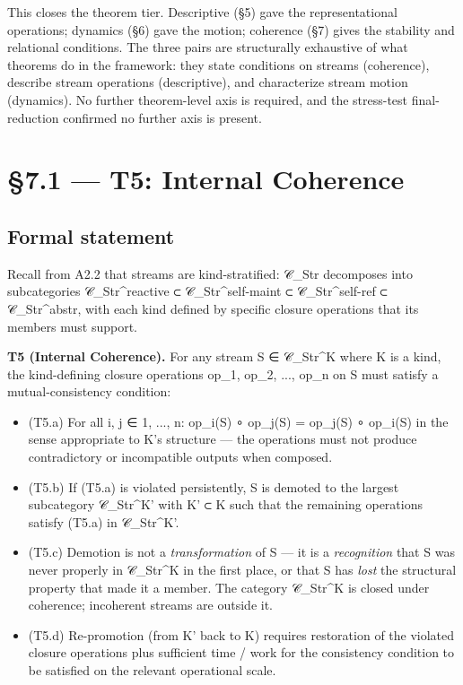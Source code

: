 \documentclass[11pt, openany]{book}
\newcommand{\sectionbreak}{\clearpage}
\begin{document}
This closes the theorem tier. Descriptive (§5) gave the representational operations; dynamics (§6) gave the motion; coherence (§7) gives the stability and relational conditions. The three pairs are structurally exhaustive of what theorems do in the framework: they state conditions on streams (coherence), describe stream operations (descriptive), and characterize stream motion (dynamics). No further theorem-level axis is required, and the stress-test final-reduction confirmed no further axis is present.

\sectionbreak

\section{§7.1 --- T5: Internal Coherence}

\subsection{Formal statement}

Recall from A2.2 that streams are kind-stratified: 𝒞\_\allowbreak{}Str decomposes into subcategories 𝒞\_\allowbreak{}Str\textasciicircum{}reactive ⊂ 𝒞\_\allowbreak{}Str\textasciicircum{}self-maint ⊂ 𝒞\_\allowbreak{}Str\textasciicircum{}self-ref ⊂ 𝒞\_\allowbreak{}Str\textasciicircum{}abstr, with each kind defined by specific closure operations that its members must support.

\textbf{T5 (Internal Coherence).} For any stream S ∈ 𝒞\_\allowbreak{}Str\textasciicircum{}K where K is a kind, the kind-defining closure operations op\_\allowbreak{}1, op\_\allowbreak{}2, ..., op\_\allowbreak{}n on S must satisfy a mutual-consistency condition:

\begin{itemize}
\item (T5.a) For all i, j ∈ {1, ..., n}: op\_\allowbreak{}i(S) ∘ op\_\allowbreak{}j(S) = op\_\allowbreak{}j(S) ∘ op\_\allowbreak{}i(S) in the sense appropriate to K's structure --- the operations must not produce contradictory or incompatible outputs when composed.
\item (T5.b) If (T5.a) is violated persistently, S is demoted to the largest subcategory 𝒞\_\allowbreak{}Str\textasciicircum{}K' with K' ⊂ K such that the remaining operations satisfy (T5.a) in 𝒞\_\allowbreak{}Str\textasciicircum{}K'.
\item (T5.c) Demotion is not a \textit{transformation} of S --- it is a \textit{recognition} that S was never properly in 𝒞\_\allowbreak{}Str\textasciicircum{}K in the first place, or that S has \textit{lost} the structural property that made it a member. The category 𝒞\_\allowbreak{}Str\textasciicircum{}K is closed under coherence; incoherent streams are outside it.
\item (T5.d) Re-promotion (from K' back to K) requires restoration of the violated closure operations plus sufficient time / work for the consistency condition to be satisfied on the relevant operational scale.
\end{itemize}
\end{document}
